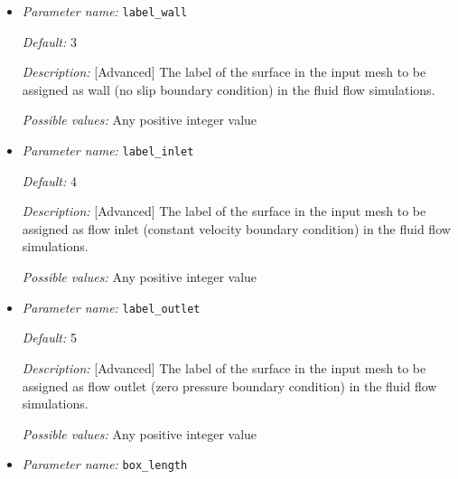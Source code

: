 \begin{itemize}

{\it Default:} 2 

{\it Description:} [Standard] The label of the (volume) region supposed to be the medium (electrolyte) in the input mesh.

{\it Possible values:} Any positive integer value 


\item {\it Parameter name:} {\tt label\_wall}
\label{parameters:label_wall}


{\it Default:} 3

{\it Description:} [Advanced] The label of the surface in the input mesh to be assigned as wall (no slip boundary condition) in the fluid flow simulations.

{\it Possible values:} Any positive integer value 


\item {\it Parameter name:} {\tt label\_inlet}
\label{parameters:label_inlet}


{\it Default:} 4

{\it Description:} [Advanced] The label of the surface in the input mesh to be assigned as flow inlet (constant velocity boundary condition) in the fluid flow simulations.

{\it Possible values:} Any positive integer value 


\item {\it Parameter name:} {\tt label\_outlet}
\label{parameters:label_outlet}


{\it Default:} 5

{\it Description:} [Advanced] The label of the surface in the input mesh to be assigned as flow outlet (zero pressure boundary condition) in the fluid flow simulations.

{\it Possible values:} Any positive integer value 


\item {\it Parameter name:} {\tt box\_length}
\label{parameters:box_length}



\end{itemize}
